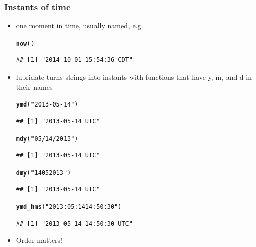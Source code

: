 \documentclass{beamer}\usepackage[]{graphicx}\usepackage[]{color}
\makeatletter
\newcommand{\hlstr}[1]{\textcolor[rgb]{0.192,0.494,0.8}{#1}}%
\newcommand{\hlstd}[1]{\textcolor[rgb]{0.345,0.345,0.345}{#1}}%
\newcommand{\hlkwd}[1]{\textcolor[rgb]{0.737,0.353,0.396}{\textbf{#1}}}%
\newenvironment{kframe}{%
 \def\at@end@of@kframe{}%
 \ifinner\ifhmode%
  \def\at@end@of@kframe{\end{minipage}}%
  \begin{minipage}{\columnwidth}%
 \fi\fi%
 \def\FrameCommand##1{\hskip\@totalleftmargin \hskip-\fboxsep
 \colorbox{shadecolor}{##1}\hskip-\fboxsep
     \hskip-\linewidth \hskip-\@totalleftmargin \hskip\columnwidth}%
 \MakeFramed {\advance\hsize-\width
   \@totalleftmargin\z@ \linewidth\hsize
   \@setminipage}}%
 {\par\unskip\endMakeFramed%
 \at@end@of@kframe}
\newenvironment{knitrout}{}{} %
\makeatother
\begin{document}
\begin{frame}[fragile]
\frametitle{Instants of time}
\begin{itemize}
\item one moment in time, usually named, e.g. 
\begin{knitrout}\footnotesize
{}\color{fgcolor}\begin{kframe}
\begin{alltt}
\hlkwd{now}\hlstd{()}
\end{alltt}
\begin{verbatim}
## [1] "2014-10-01 15:54:36 CDT"
\end{verbatim}
\end{kframe}
\end{knitrout}
\item lubridate turns strings into instants with functions that have y, m, and d in their names
\begin{knitrout}\footnotesize
{}\color{fgcolor}\begin{kframe}
\begin{alltt}
\hlkwd{ymd}\hlstd{(}\hlstr{"2013-05-14"}\hlstd{)}
\end{alltt}
\begin{verbatim}
## [1] "2013-05-14 UTC"
\end{verbatim}
\begin{alltt}
\hlkwd{mdy}\hlstd{(}\hlstr{"05/14/2013"}\hlstd{)}
\end{alltt}
\begin{verbatim}
## [1] "2013-05-14 UTC"
\end{verbatim}
\begin{alltt}
\hlkwd{dmy}\hlstd{(}\hlstr{"14052013"}\hlstd{)}
\end{alltt}
\begin{verbatim}
## [1] "2013-05-14 UTC"
\end{verbatim}
\begin{alltt}
\hlkwd{ymd_hms}\hlstd{(}\hlstr{"2013:05:14 14:50:30"}\hlstd{)}
\end{alltt}
\begin{verbatim}
## [1] "2013-05-14 14:50:30 UTC"
\end{verbatim}
\end{kframe}
\end{knitrout}
\item Order matters!
\end{itemize}
\end{frame}
\end{document}
